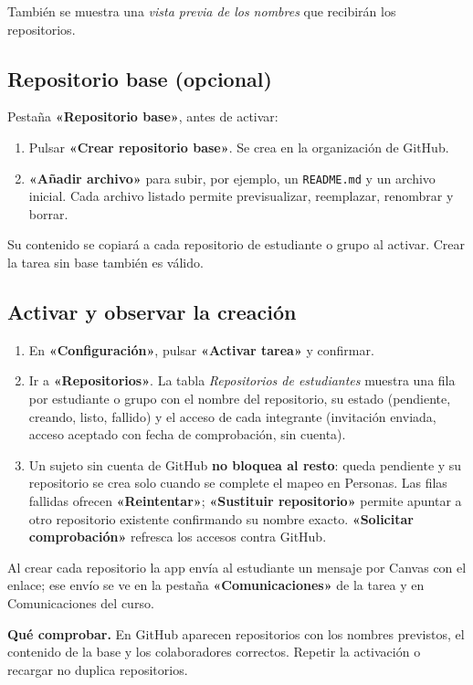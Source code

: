 \documentclass[11pt,a4paper]{article}
\newenvironment{comprobar}
  {\def\FrameCommand{\fcolorbox{verde}{verdefondo}}\MakeFramed{\advance\hsize-\width\FrameRestore}\noindent\textbf{\textcolor{verde}{Qué comprobar.}} }
  {\endMakeFramed}
\newcommand{\ui}[1]{\textbf{«#1»}}        %
\begin{document}
También se muestra una \emph{vista previa de los nombres} que recibirán los repositorios.

\subsection{Repositorio base (opcional)}

Pestaña \ui{Repositorio base}, antes de activar:

\begin{enumerate}
  \item Pulsar \ui{Crear repositorio base}. Se crea en la organización de GitHub.
  \item \ui{Añadir archivo} para subir, por ejemplo, un \texttt{README.md} y un archivo inicial. Cada archivo listado permite previsualizar, reemplazar, renombrar y borrar.
\end{enumerate}

Su contenido se copiará a cada repositorio de estudiante o grupo al activar. Crear la tarea sin base también es válido.

\subsection{Activar y observar la creación}

\begin{enumerate}
  \item En \ui{Configuración}, pulsar \ui{Activar tarea} y confirmar.
  \item Ir a \ui{Repositorios}. La tabla \emph{Repositorios de estudiantes} muestra una fila por estudiante o grupo con el nombre del repositorio, su estado (pendiente, creando, listo, fallido) y el acceso de cada integrante (invitación enviada, acceso aceptado con fecha de comprobación, sin cuenta).
  \item Un sujeto sin cuenta de GitHub \textbf{no bloquea al resto}: queda pendiente y su repositorio se crea solo cuando se complete el mapeo en Personas. Las filas fallidas ofrecen \ui{Reintentar}; \ui{Sustituir repositorio} permite apuntar a otro repositorio existente confirmando su nombre exacto. \ui{Solicitar comprobación} refresca los accesos contra GitHub.
\end{enumerate}

Al crear cada repositorio la app envía al estudiante un mensaje por Canvas con el enlace; ese envío se ve en la pestaña \ui{Comunicaciones} de la tarea y en Comunicaciones del curso.

\begin{comprobar}
En GitHub aparecen repositorios con los nombres previstos, el contenido de la base y los colaboradores correctos. Repetir la activación o recargar no duplica repositorios.
\end{comprobar}
\end{document}
